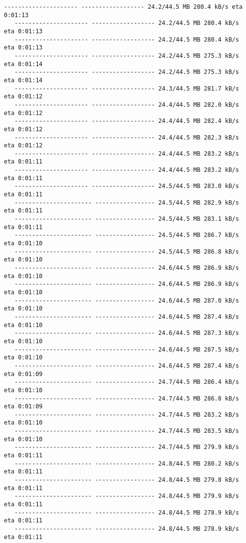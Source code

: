 \documentclass[11pt]{article}
\begin{document}
\begin{Verbatim}[commandchars=\\\{\}]
   --------------------- ------------------ 24.2/44.5 MB 280.4 kB/s eta 0:01:13
   --------------------- ------------------ 24.2/44.5 MB 280.4 kB/s eta 0:01:13
   --------------------- ------------------ 24.2/44.5 MB 280.4 kB/s eta 0:01:13
   --------------------- ------------------ 24.2/44.5 MB 275.3 kB/s eta 0:01:14
   --------------------- ------------------ 24.2/44.5 MB 275.3 kB/s eta 0:01:14
   --------------------- ------------------ 24.3/44.5 MB 281.7 kB/s eta 0:01:12
   --------------------- ------------------ 24.4/44.5 MB 282.0 kB/s eta 0:01:12
   --------------------- ------------------ 24.4/44.5 MB 282.4 kB/s eta 0:01:12
   --------------------- ------------------ 24.4/44.5 MB 282.3 kB/s eta 0:01:12
   --------------------- ------------------ 24.4/44.5 MB 283.2 kB/s eta 0:01:11
   --------------------- ------------------ 24.4/44.5 MB 283.2 kB/s eta 0:01:11
   --------------------- ------------------ 24.5/44.5 MB 283.0 kB/s eta 0:01:11
   ---------------------- ----------------- 24.5/44.5 MB 282.9 kB/s eta 0:01:11
   ---------------------- ----------------- 24.5/44.5 MB 283.1 kB/s eta 0:01:11
   ---------------------- ----------------- 24.5/44.5 MB 286.7 kB/s eta 0:01:10
   ---------------------- ----------------- 24.5/44.5 MB 286.8 kB/s eta 0:01:10
   ---------------------- ----------------- 24.6/44.5 MB 286.9 kB/s eta 0:01:10
   ---------------------- ----------------- 24.6/44.5 MB 286.9 kB/s eta 0:01:10
   ---------------------- ----------------- 24.6/44.5 MB 287.0 kB/s eta 0:01:10
   ---------------------- ----------------- 24.6/44.5 MB 287.4 kB/s eta 0:01:10
   ---------------------- ----------------- 24.6/44.5 MB 287.3 kB/s eta 0:01:10
   ---------------------- ----------------- 24.6/44.5 MB 287.5 kB/s eta 0:01:10
   ---------------------- ----------------- 24.6/44.5 MB 287.4 kB/s eta 0:01:09
   ---------------------- ----------------- 24.7/44.5 MB 286.4 kB/s eta 0:01:10
   ---------------------- ----------------- 24.7/44.5 MB 286.8 kB/s eta 0:01:09
   ---------------------- ----------------- 24.7/44.5 MB 283.2 kB/s eta 0:01:10
   ---------------------- ----------------- 24.7/44.5 MB 283.5 kB/s eta 0:01:10
   ---------------------- ----------------- 24.7/44.5 MB 279.9 kB/s eta 0:01:11
   ---------------------- ----------------- 24.8/44.5 MB 280.2 kB/s eta 0:01:11
   ---------------------- ----------------- 24.8/44.5 MB 279.8 kB/s eta 0:01:11
   ---------------------- ----------------- 24.8/44.5 MB 279.9 kB/s eta 0:01:11
   ---------------------- ----------------- 24.8/44.5 MB 278.9 kB/s eta 0:01:11
   ---------------------- ----------------- 24.8/44.5 MB 278.9 kB/s eta 0:01:11

\end{Verbatim}
\end{document}
